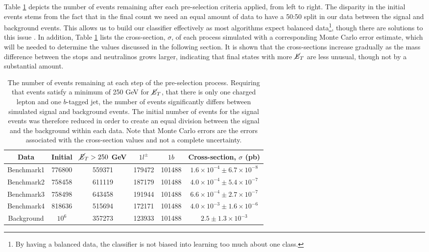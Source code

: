 Table \ref{tab:preselection} depicts the number of events remaining after each pre-selection criteria applied, from left to right. The disparity in the initial events stems from the fact that in the final count we need an equal amount of data to have a 50:50 split in our data between the signal and background events. This allows us to build our classifier effectively as most algorithms expect balanced data\footnote{By having a balanced data, the classifier is not biased into learning too much about one class.}, though there are solutions to this issue \cite{he2009learning}. In addition, Table \ref{tab:preselection} lists the cross-section, $\sigma$, of each process simulated with a corresponding Monte Carlo error estimate, which will be needed to determine the values discussed in the following section. It is shown that the cross-sections increase gradually as the mass difference between the stops and neutralinos grows larger, indicating that final states with more $\cancel{\it{E}}_{T}$ are less unusual, though not by a substantial amount. \\

\begin{table}[htbp]
    \centering
    \begin{tabular}{c|c|c|c|c||c} 
    \toprule
    Data & Initial & $\cancel{\it{E}}_{T}>250$ GeV & $1l^\pm$ & $1b$ & Cross-section, $\sigma$ (pb) \\
    \midrule
    \rowcolor{gray!6} Benchmark1 & 776800 & 559371 & 179472 & 101488 & $1.6\times10^{-4} \pm 6.7\times10^{-8}$ \\
    Benchmark2 & 758458 & 611119 & 187179 & 101488 & $4.0\times10^{-4} \pm  5.4\times10^{-7}$ \\
    \rowcolor{gray!6} Benchmark3 & 758498 & 643458 & 191944 & 101488 & $6.6\times10^{-4} \pm 2.7\times10^{-7}$ \\
    Benchmark4 & 818636 & 515694 & 172171 &101488  & $4.0\times10^{-3} \pm 1.6\times10^{-6}$ \\
    \rowcolor{gray!6} Background & $10^6$ & 357273 & 123933 & 101488 & $2.5 \pm 1.3\times10^{-3}$ \\
    \bottomrule
    \end{tabular}
    \caption{The number of events remaining at each step of the pre-selection process. Requiring that events satisfy a minimum of 250 GeV for $\cancel{\it{E}}_{T}$, that there is only one charged lepton and one $b$-tagged jet, the number of events significantly differs between simulated signal and background events. The initial number of events for the signal events was therefore reduced in order to create an equal division between the signal and the background within each data. Note that Monte Carlo errors are the errors associated with the cross-section values and not a complete uncertainty.} 
    \label{tab:preselection}
\end{table}